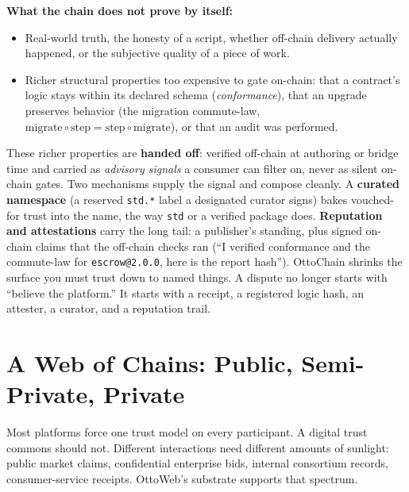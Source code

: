 \documentclass[11pt,a4paper]{article}
\begin{document}
\noindent\textbf{What the chain does not prove by itself:}
\begin{itemize}
    \item Real-world truth, the honesty of a script, whether off-chain delivery actually happened, or the subjective quality of a piece of work.
    \item Richer structural properties too expensive to gate on-chain: that a contract's logic stays within its declared schema (\emph{conformance}), that an upgrade preserves behavior (the migration commute-law, $\mathrm{migrate}\circ\mathrm{step}=\mathrm{step}\circ\mathrm{migrate}$), or that an audit was performed.
\end{itemize}

These richer properties are \textbf{handed off}: verified off-chain at authoring or bridge time and carried as \emph{advisory signals} a consumer can filter on, never as silent on-chain gates. Two mechanisms supply the signal and compose cleanly. A \textbf{curated namespace} (a reserved \texttt{std.*} label a designated curator signs) bakes vouched-for trust into the name, the way \texttt{std} or a verified package does. \textbf{Reputation and attestations} carry the long tail: a publisher's standing, plus signed on-chain claims that the off-chain checks ran (``I verified conformance and the commute-law for \texttt{escrow@2.0.0}, here is the report hash''). OttoChain shrinks the surface you must trust down to named things. A dispute no longer starts with ``believe the platform.'' It starts with a receipt, a registered logic hash, an attester, a curator, and a reputation trail.

\section{A Web of Chains: Public, Semi-Private, Private}

Most platforms force one trust model on every participant. A digital trust commons should not. Different interactions need different amounts of sunlight: public market claims, confidential enterprise bids, internal consortium records, consumer-service receipts. OttoWeb's substrate supports that spectrum.
\end{document}
